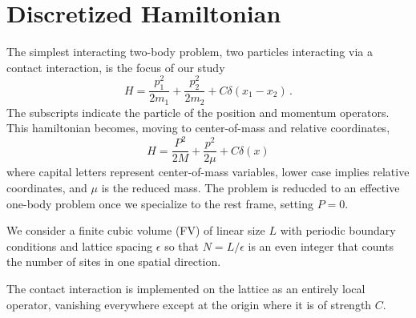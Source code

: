 \section{Discretized Hamiltonian}\label{sec:hamiltonian}

The simplest interacting two-body problem, two particles interacting via a contact interaction, is the focus of our study
\begin{equation}
    \label{eq:particle hamiltonian}
    H = \frac{p_1^2}{2 m_1} + \frac{p_2^2}{2 m_2} + C \delta(x_1-x_2)
    \, .
\end{equation}
The subscripts indicate the particle of the position and momentum operators.
This hamiltonian becomes, moving to center-of-mass and relative coordinates,
\begin{equation}
    \label{eq:hamiltonian}
    H = \frac{P^2}{2 M} + \frac{p^2}{2 \mu} + C \delta(x)
\end{equation}
where capital letters represent center-of-mass variables, lower case implies relative coordinates, and $\mu$ is the reduced mass.
The problem is reducded to an effective one-body problem once we specialize to the rest frame, setting $P=0$.

We consider a finite cubic volume (FV) of linear size $L$ with periodic boundary conditions and lattice spacing $\epsilon$ so that $N=L/\epsilon$ is an even integer that counts the number of sites in one spatial direction.

The contact interaction is implemented on the lattice as an entirely local operator, vanishing everywhere except at the origin where it is of strength $C$.

